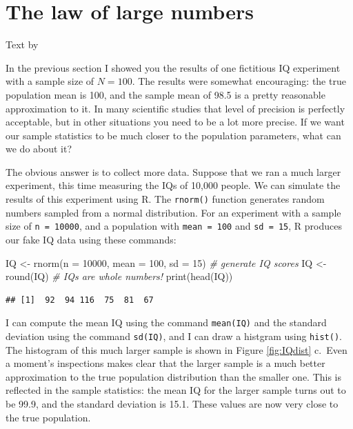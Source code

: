 \documentclass[
]{book}
\newenvironment{Shaded}{\begin{snugshade}}{\end{snugshade}}
\newcommand{\AttributeTok}[1]{\textcolor[rgb]{0.77,0.63,0.00}{#1}}
\newcommand{\CommentTok}[1]{\textcolor[rgb]{0.56,0.35,0.01}{\textit{#1}}}
\newcommand{\DecValTok}[1]{\textcolor[rgb]{0.00,0.00,0.81}{#1}}
\newcommand{\FunctionTok}[1]{\textcolor[rgb]{0.00,0.00,0.00}{#1}}
\newcommand{\NormalTok}[1]{#1}
\newcommand{\OtherTok}[1]{\textcolor[rgb]{0.56,0.35,0.01}{#1}}
\begin{document}
\hypertarget{lawlargenumbers}{%
\section{The law of large numbers}\label{lawlargenumbers}}

Text by \citet{Navarro2018}

In the previous section I showed you the results of one fictitious IQ experiment with a sample size of \(N=100\). The results were somewhat encouraging: the true population mean is 100, and the sample mean of 98.5 is a pretty reasonable approximation to it. In many scientific studies that level of precision is perfectly acceptable, but in other situations you need to be a lot more precise. If we want our sample statistics to be much closer to the population parameters, what can we do about it?

The obvious answer is to collect more data. Suppose that we ran a much larger experiment, this time measuring the IQs of 10,000 people. We can simulate the results of this experiment using R. The \texttt{rnorm()} function generates random numbers sampled from a normal distribution. For an experiment with a sample size of \texttt{n\ =\ 10000}, and a population with \texttt{mean\ =\ 100} and \texttt{sd\ =\ 15}, R produces our fake IQ data using these commands:

\begin{Shaded}
\begin{Highlighting}[]
\NormalTok{IQ }\OtherTok{\textless{}{-}} \FunctionTok{rnorm}\NormalTok{(}\AttributeTok{n =} \DecValTok{10000}\NormalTok{, }\AttributeTok{mean =} \DecValTok{100}\NormalTok{, }\AttributeTok{sd =} \DecValTok{15}\NormalTok{) }\CommentTok{\# generate IQ scores}
\NormalTok{IQ }\OtherTok{\textless{}{-}} \FunctionTok{round}\NormalTok{(IQ) }\CommentTok{\# IQs are whole numbers!}
\FunctionTok{print}\NormalTok{(}\FunctionTok{head}\NormalTok{(IQ))}
\end{Highlighting}
\end{Shaded}

\begin{verbatim}
## [1]  92  94 116  75  81  67
\end{verbatim}

I can compute the mean IQ using the command \texttt{mean(IQ)} and the standard deviation using the command \texttt{sd(IQ)}, and I can draw a histgram using \texttt{hist()}. The histogram of this much larger sample is shown in Figure \ref{fig:IQdist} c.~Even a moment's inspections makes clear that the larger sample is a much better approximation to the true population distribution than the smaller one. This is reflected in the sample statistics: the mean IQ for the larger sample turns out to be 99.9, and the standard deviation is 15.1. These values are now very close to the true population.
\end{document}
